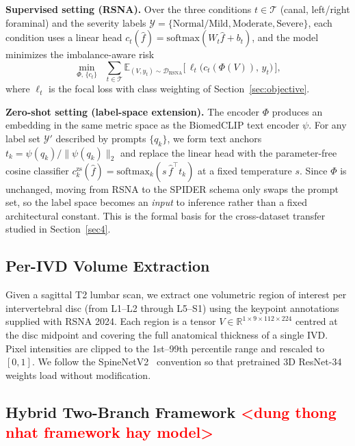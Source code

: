 \documentclass[runningheads]{llncs}
\begin{document}
\textbf{Supervised setting (RSNA).} Over the three conditions $t \in \mathcal{T}$ (canal, left/right foraminal) and the severity labels $\mathcal{Y} = \{\text{Normal/Mild},\text{Moderate},\text{Severe}\}$, each condition uses a linear head $c_t(\hat f) = \mathrm{softmax}(W_t \hat f + b_t)$, and the model minimizes the imbalance-aware risk
\begin{equation}
\min_{\Phi,\,\{c_t\}} \;\; \sum_{t \in \mathcal{T}} \mathbb{E}_{(V, y_t) \sim \mathcal{D}_{\text{RSNA}}} \big[\, \ell_t\big(c_t(\Phi(V)),\, y_t\big)\,\big],
\label{eq:erm}
\end{equation}
where $\ell_t$ is the focal loss with class weighting of Section~\ref{sec:objective}.

\textbf{Zero-shot setting (label-space extension).} The encoder $\Phi$ produces an embedding in the same metric space as the BiomedCLIP text encoder $\psi$. For any label set $\mathcal{Y}'$ described by prompts $\{q_k\}$, we form text anchors $t_k = \psi(q_k)/\|\psi(q_k)\|_2$ and replace the linear head with the parameter-free cosine classifier $c^{\text{zs}}_k(\hat f) = \mathrm{softmax}_k(s\,\hat f^{\top} t_k)$ at a fixed temperature $s$. Since $\Phi$ is unchanged, moving from RSNA to the SPIDER schema only swaps the prompt set, so the label space becomes an \emph{input} to inference rather than a fixed architectural constant. This is the formal basis for the cross-dataset transfer studied in Section~\ref{sec4}.

\subsection{Per-IVD Volume Extraction}

Given a sagittal T2 lumbar scan, we extract one volumetric region of interest per intervertebral disc (from L1--L2 through L5--S1) using the keypoint annotations supplied with RSNA 2024. Each region is a tensor $V \in \mathbb{R}^{1 \times 9 \times 112 \times 224}$ centred at the disc midpoint and covering the full anatomical thickness of a single IVD. Pixel intensities are clipped to the 1st--99th percentile range and rescaled to $[0, 1]$. We follow the SpineNetV2~\cite{windsor2022} convention so that pretrained 3D ResNet-34 weights load without modification.

\subsection{Hybrid Two-Branch Framework \textcolor{red}{<dung thong nhat framework hay model>}}\label{wf}
\end{document}
